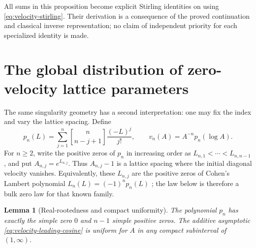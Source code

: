 \documentclass[11pt]{article}
\numberwithin{equation}{section}
\newtheorem{lemma}[theorem]{Lemma}
\theoremstyle{definition}
\theoremstyle{remark}
\newcommand{\stirling}[2]{\genfrac{[}{]}{0pt}{}{#1}{#2}}
\begin{document}
All sums in this proposition become explicit Stirling identities on
using \eqref{eq:velocity-stirling}.  Their derivation is a consequence
of the proved continuation and classical inverse representation;
no claim of independent priority for each specialized identity is made.

\section{The global distribution of zero-velocity lattice parameters}
\label{sec:velocity-zero-law}

The same singularity geometry has a second interpretation: one may fix
the index and vary the lattice spacing.  Define
\[
 p_n(L)=\sum_{j=1}^n\stirling{n}{n-j+1}\frac{(-L)^j}{j!},
 \qquad v_n(A)=A^{-n}p_n(\log A).
\]
For $n\geq2$, write the positive zeros of $p_n$ in increasing order as
$L_{n,1}<\cdots<L_{n,n-1}$, and put $A_{n,j}=e^{L_{n,j}}$.
Thus $A_{n,j}-1$ is a lattice spacing where the initial diagonal
velocity vanishes.  Equivalently, these $L_{n,j}$ are the positive
zeros of Cohen's Lambert polynomial $L_n(L)=(-1)^np_n(L)$
\cite[Proposition~4.8]{Cohen2021}; the law below is therefore a bulk
zero law for that known family.

\begin{lemma}[Real-rootedness and compact uniformity]
\label{lem:zero-law-inputs}
The polynomial $p_n$ has exactly the simple zero $0$ and $n-1$ simple
positive zeros.  The additive asymptotic
\eqref{eq:velocity-leading-cosine} is uniform for $A$ in any compact
subinterval of $(1,\infty)$.
\end{lemma}
\end{document}
